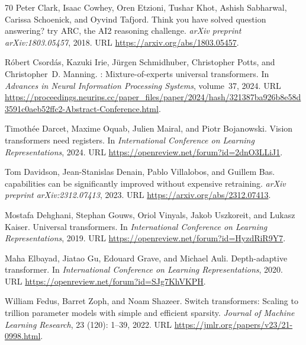 \documentclass[]{bytedance_seed}
\theoremstyle{definition}
\theoremstyle{remark}
\begin{document}
\begin{thebibliography}{70}
Peter Clark, Isaac Cowhey, Oren Etzioni, Tushar Khot, Ashish Sabharwal, Carissa
  Schoenick, and Oyvind Tafjord.
\newblock Think you have solved question answering? try {ARC}, the {AI2}
  reasoning challenge.
\newblock \emph{arXiv preprint arXiv:1803.05457}, 2018.
\newblock URL \url{https://arxiv.org/abs/1803.05457}.

R{\'o}bert Csord{\'a}s, Kazuki Irie, J{\"u}rgen Schmidhuber, Christopher Potts,
  and Christopher~D. Manning.
: Mixture-of-experts universal transformers.
\newblock In \emph{Advances in Neural Information Processing Systems},
  volume~37, 2024.
\newblock URL
  \url{https://proceedings.neurips.cc/paper_files/paper/2024/hash/321387ba926b8e58d3591c0aeb52ffc2-Abstract-Conference.html}.

Timoth{\'e}e Darcet, Maxime Oquab, Julien Mairal, and Piotr Bojanowski.
\newblock Vision transformers need registers.
\newblock In \emph{International Conference on Learning Representations}, 2024.
\newblock URL \url{https://openreview.net/forum?id=2dnO3LLiJ1}.

Tom Davidson, Jean-Stanislas Denain, Pablo Villalobos, and Guillem Bas.
 capabilities can be significantly improved without expensive
  retraining.
\newblock \emph{arXiv preprint arXiv:2312.07413}, 2023.
\newblock URL \url{https://arxiv.org/abs/2312.07413}.

Mostafa Dehghani, Stephan Gouws, Oriol Vinyals, Jakob Uszkoreit, and Lukasz
  Kaiser.
\newblock Universal transformers.
\newblock In \emph{International Conference on Learning Representations}, 2019.
\newblock URL \url{https://openreview.net/forum?id=HyzdRiR9Y7}.

Maha Elbayad, Jiatao Gu, Edouard Grave, and Michael Auli.
\newblock Depth-adaptive transformer.
\newblock In \emph{International Conference on Learning Representations}, 2020.
\newblock URL \url{https://openreview.net/forum?id=SJg7KhVKPH}.

William Fedus, Barret Zoph, and Noam Shazeer.
\newblock Switch transformers: Scaling to trillion parameter models with simple
  and efficient sparsity.
\newblock \emph{Journal of Machine Learning Research}, 23
  (120): 1--39, 2022.
\newblock URL \url{https://jmlr.org/papers/v23/21-0998.html}.


\end{thebibliography}
\end{document}
